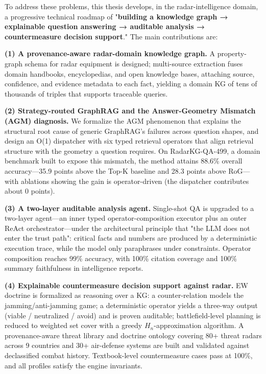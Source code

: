 \documentclass[12pt,a4paper]{ctexart}
\begin{document}
To address these problems, this thesis develops, in the radar-intelligence domain, a progressive technical roadmap of "\textbf{building a knowledge graph → explainable question answering → auditable analysis → countermeasure decision support}." The main contributions are:

\textbf{(1) A provenance-aware radar-domain knowledge graph.} A property-graph schema for radar equipment is designed; multi-source extraction fuses domain handbooks, encyclopedias, and open knowledge bases, attaching source, confidence, and evidence metadata to each fact, yielding a domain KG of tens of thousands of triples that supports traceable queries.

\textbf{(2) Strategy-routed GraphRAG and the Answer-Geometry Mismatch (AGM) diagnosis.} We formalize the AGM phenomenon that explains the structural root cause of generic GraphRAG's failures across question shapes, and design an O(1) dispatcher with six typed retrieval operators that align retrieval structure with the geometry a question requires. On RadarKG-QA-499, a domain benchmark built to expose this mismatch, the method attains 88.6\% overall accuracy—35.9 points above the Top-K baseline and 28.3 points above RoG—with ablations showing the gain is operator-driven (the dispatcher contributes about 0 points).

\textbf{(3) A two-layer auditable analysis agent.} Single-shot QA is upgraded to a two-layer agent—an inner typed operator-composition executor plus an outer ReAct orchestrator—under the architectural principle that "the LLM does not enter the trust path": critical facts and numbers are produced by a deterministic execution trace, while the model only paraphrases under constraints. Operator composition reaches 99\% accuracy, with 100\% citation coverage and 100\% summary faithfulness in intelligence reports.

\textbf{(4) Explainable countermeasure decision support against radar.} EW doctrine is formalized as reasoning over a KG: a counter-relation models the jamming/anti-jamming game; a deterministic operator yields a three-way output (viable / neutralized / avoid) and is proven auditable; battlefield-level planning is reduced to weighted set cover with a greedy $H_n$-approximation algorithm. A provenance-aware threat library and doctrine ontology covering 80+ threat radars across 9 countries and 30+ air-defense systems are built and validated against declassified combat history. Textbook-level countermeasure cases pass at 100\%, and all profiles satisfy the engine invariants.
\end{document}
